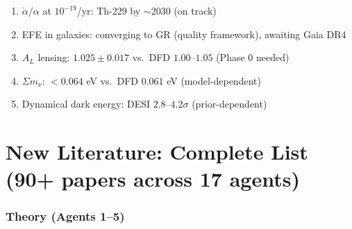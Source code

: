 \documentclass[11pt,a4paper]{article}
\begin{document}
\begin{enumerate}
\item $\dot{\alpha}/\alpha$ at $10^{-19}$/yr: Th-229 by $\sim$2030 (on track)
\item EFE in galaxies: converging to GR (quality framework), awaiting Gaia DR4
\item $A_L$ lensing: $1.025 \pm 0.017$ vs.\ DFD $1.00$--$1.05$ (Phase 0 needed)
\item $\Sigma m_\nu$: $< 0.064$ eV vs.\ DFD $0.061$ eV (model-dependent)
\item Dynamical dark energy: DESI $2.8$--$4.2\sigma$ (prior-dependent)
\end{enumerate}


\part{New Literature: Complete List (90+ papers across 17 agents)}

\section{Theory (Agents 1--5)}
\end{document}
